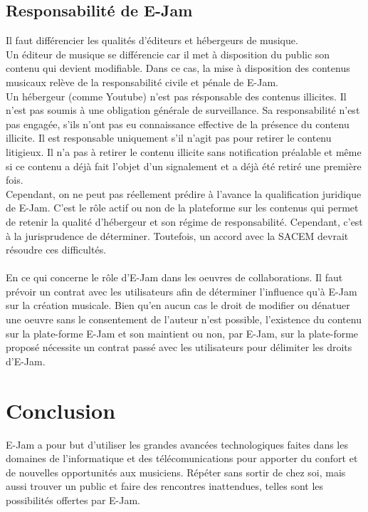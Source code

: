 \documentclass[a4,12pt]{article}
\begin{document}
\subsection{Responsabilité de E-Jam}

Il faut différencier les qualités d'éditeurs et hébergeurs de musique.\\
Un éditeur de musique se différencie car il met à disposition du public son contenu qui devient modifiable. Dans ce cas, la mise à disposition des contenus musicaux relève de la responsabilité civile et pénale de E-Jam.\\
Un hébergeur (comme Youtube) n'est pas résponsable des contenus illicites. Il n'est pas soumis à une obligation générale de surveillance. Sa responsabilité n'est pas engagée, s'ils n'ont pas eu connaissance effective de la présence du contenu illicite. Il est responsable uniquement s'il n'agit pas pour retirer le contenu litigieux. Il n'a pas à retirer le contenu illicite sans notification préalable et même si ce contenu a déjà fait l'objet d'un signalement et a déjà été retiré une première fois.\\
Cependant, on ne peut pas réellement prédire à l'avance la qualification juridique de E-Jam. C'est le rôle actif ou non de la plateforme sur les contenus qui permet de retenir la qualité d'hébergeur et son régime de responsabilité. Cependant, c'est à la jurisprudence de déterminer. Toutefois, un accord avec la SACEM devrait résoudre ces difficultés.\\
\\
En ce qui concerne le rôle d'E-Jam dans les oeuvres de collaborations. Il faut prévoir un contrat avec les utilisateurs afin de déterminer l'influence qu'à E-Jam sur la création musicale. Bien qu'en aucun cas le droit de modifier ou dénatuer une oeuvre sans le consentement de l'auteur n'est possible, l'existence du contenu sur la plate-forme E-Jam et son maintient ou non, par E-Jam, sur la plate-forme proposé nécessite un contrat passé avec les utilisateurs pour délimiter les droits d'E-Jam.


\section{Conclusion}

E-Jam a pour but d'utiliser les grandes avancées technologiques faites dans les
domaines de l'informatique et des télécomunications pour apporter du confort et de
nouvelles opportunités aux musiciens. Répéter sans sortir de chez soi, mais aussi
trouver un public et faire des rencontres inattendues, telles sont les possibilités
offertes par E-Jam.
\end{document}
